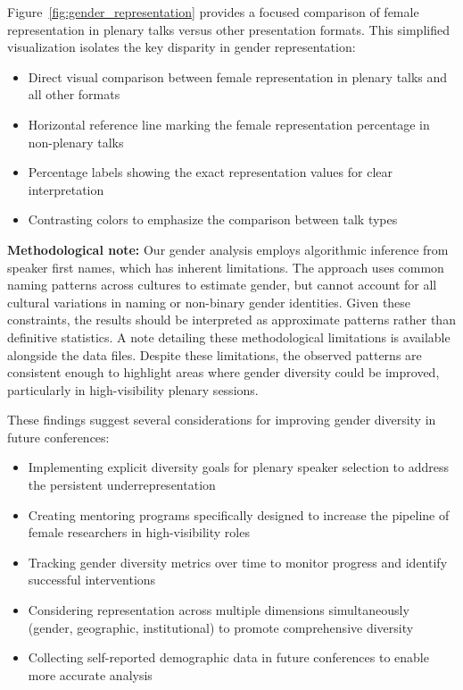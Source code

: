 \documentclass[a4paper,11pt]{article}
\begin{document}
Figure~\ref{fig:gender_representation} provides a focused comparison of female representation in plenary talks versus other presentation formats. This simplified visualization isolates the key disparity in gender representation:

\begin{itemize}
    \item Direct visual comparison between female representation in plenary talks and all other formats
    \item Horizontal reference line marking the female representation percentage in non-plenary talks
    \item Percentage labels showing the exact representation values for clear interpretation
    \item Contrasting colors to emphasize the comparison between talk types
\end{itemize}

\textbf{Methodological note:} Our gender analysis employs algorithmic inference from speaker first names, which has inherent limitations. The approach uses common naming patterns across cultures to estimate gender, but cannot account for all cultural variations in naming or non-binary gender identities. Given these constraints, the results should be interpreted as approximate patterns rather than definitive statistics. A note detailing these methodological limitations is available alongside the data files. Despite these limitations, the observed patterns are consistent enough to highlight areas where gender diversity could be improved, particularly in high-visibility plenary sessions.

These findings suggest several considerations for improving gender diversity in future conferences:

\begin{itemize}
    \item Implementing explicit diversity goals for plenary speaker selection to address the persistent underrepresentation
    \item Creating mentoring programs specifically designed to increase the pipeline of female researchers in high-visibility roles
    \item Tracking gender diversity metrics over time to monitor progress and identify successful interventions
    \item Considering representation across multiple dimensions simultaneously (gender, geographic, institutional) to promote comprehensive diversity
    \item Collecting self-reported demographic data in future conferences to enable more accurate analysis
\end{itemize}
\end{document}
